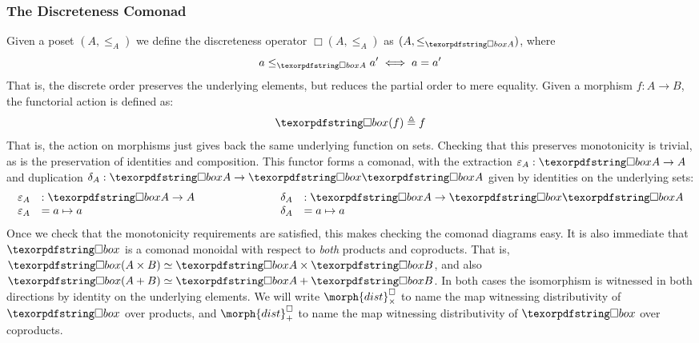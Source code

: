 \subsubsection{The Discreteness Comonad}
Given a poset $(A, \leq_A)$ we define the discreteness operator $\Box(A, \leq_A)$
as $(A, \leq_{\iso A})$, where
\begin{displaymath}
  a \leq_{\iso A} a' \iff a = a'
\end{displaymath}
That is, the discrete order preserves the underlying elements, but reduces the partial order
to mere equality. Given a morphism $f : A \to B$, the functorial
action is defined as:
\begin{displaymath}
  \iso(f) \triangleq f
\end{displaymath}
That is, the action on morphisms just gives back the same underlying function on sets. Checking
that this preserves monotonicity is trivial, as is the preservation of identities and
composition. This functor forms a comonad, with the extraction $\varepsilon_A : \iso A \to A$
and duplication $\delta_A : \iso A \to \iso \iso A$ given by identities on the underlying
sets:
\begin{displaymath}
  \begin{array}{llcll}
  \varepsilon_A & : \iso A \to A & \hspace{2cm} & \delta_A & : \iso A \to \iso \iso A \\
  \varepsilon_A & = a \mapsto a & & \delta_A & = a \mapsto a
  \end{array}
\end{displaymath}
Once we check that the monotonicity requirements are satisfied, this
makes checking the comonad diagrams easy. It is also immediate that $\iso$ is a comonad
monoidal with respect to \emph{both} products and coproducts. That is, $\iso (A \times B)
\simeq \iso A \times \iso B$, and also $\iso (A + B) \simeq \iso A + \iso B$. In both
cases the isomorphism is witnessed in both directions by identity on the underlying elements.
We will write $\morph{dist}^\Box_\times$  to name the map witnessing distributivity of $\iso$ over
products, and $\morph{dist}^\Box_+$  to name the map witnessing distributivity of $\iso$ over coproducts.

